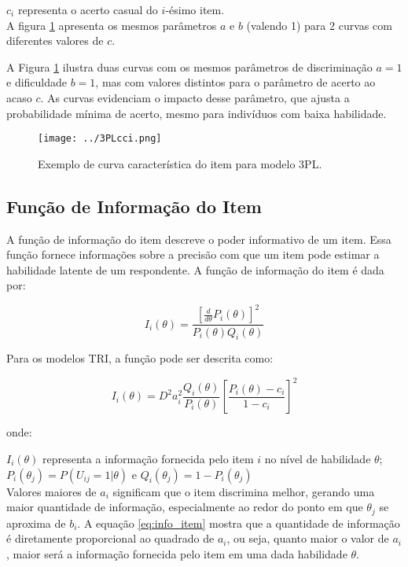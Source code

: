 \noindent $c_i$ representa o acerto casual do $i$-ésimo item.\\


A figura \ref{fig:3PL} apresenta os mesmos parâmetros $a$ e $b$ (valendo 1) para 2 curvas com diferentes valores de $c$.

A Figura \ref{fig:3PL} ilustra duas curvas com os mesmos parâmetros de discriminação $a = 1$ e dificuldade $b = 1$, mas com valores distintos para o parâmetro de acerto ao acaso $c$. As curvas evidenciam o impacto desse parâmetro, que ajusta a probabilidade mínima de acerto, mesmo para indivíduos com baixa habilidade. 

\begin{figure}[H]
	\centering
	\caption{Exemplo de curva característica do item para modelo 3PL.}
	\texttt{[image: ../3PLcci.png]}
	\parbox{\textwidth}{
		\centering %
	}
	\label{fig:3PL}
\end{figure}


\subsection{Função de Informação do Item}

A função de informação do item descreve o poder informativo de um item. Essa função fornece informações sobre a precisão com que um item pode estimar a habilidade latente de um respondente. \cite{de2000teoria} 
A função de informação do item é dada por:

\[
		I_i(\theta) = \dfrac{[\frac{d}{d\theta}P_i(\theta)]^2}{P_i(\theta)Q_i(\theta)}
\]

Para os modelos TRI, a função pode ser descrita como:

\begin{equation}\label{eq:info_item}
	I_i(\theta) = D^2 a_i^2\frac{Q_i(\theta)}{P_i(\theta)} \left[\frac{P_i(\theta) - c_i}{1 - c_i}\right]^2
\end{equation}

onde:

\noindent $I_i(\theta) $ representa a informação fornecida pelo item $i$ no nível de habilidade $\theta$;\\

\noindent $P_i(\theta_j) = P(U_{ij} = 1| \theta) $ e $ Q_i(\theta_j) = 1 - P_i(\theta_j) $ \\

Valores maiores de $a_i$ significam que o item discrimina melhor, gerando uma maior quantidade de informação, especialmente ao redor do ponto em que $\theta_j$ se aproxima de $b_i$. A equação \ref{eq:info_item} mostra que a quantidade de informação é diretamente proporcional ao quadrado de $a_i$, ou seja, quanto maior o valor de $a_i$, maior será a informação fornecida pelo item em uma dada habilidade $\theta$.

